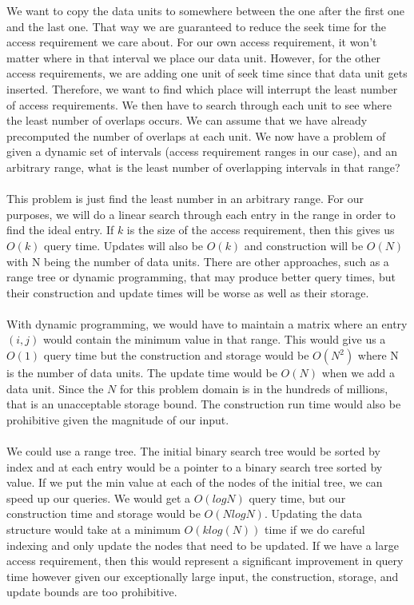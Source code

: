 \documentclass[11pt,psfig]{article}
\begin{document}
We want to copy the data units to somewhere between the one after the first one and the last one. That way we are guaranteed to reduce the seek time for the access requirement we care about. For our own access requirement, it won't matter where in that interval we place our data unit. However, for the other access requirements, we are adding one unit of seek time since that data unit gets inserted. Therefore, we want to find which place will interrupt the least number of access requirements. We then have to search through each unit to see where the least number of overlaps occurs. We can assume that we have already precomputed the number of overlaps at each unit. We now have a problem of given a dynamic set of intervals (access requirement ranges in our case), and an arbitrary range, what is the least number of overlapping intervals in that range?\\
\\
This problem is just find the least number in an arbitrary range. For our purposes, we will do a linear search through each entry in the range in order to find the ideal entry. If $k$ is the size of the access requirement, then this gives us $O(k)$ query time. Updates will also be $O(k)$ and construction will be $O(N)$ with N being the number of data units. There are other approaches, such as a range tree or dynamic programming, that may produce better query times, but their construction and update times will be worse as well as their storage. \\
\\
With dynamic programming, we would have to maintain a matrix where an entry $(i,j)$ would contain the minimum value in that range. This would give us a $O(1)$ query time but the construction and storage would be $O(N^2)$ where N is the number of data units. The update time would be $O(N)$ when we add a data unit. Since the $N$ for this problem domain is in the hundreds of millions, that is an unacceptable storage bound. The construction run time would also be prohibitive given the magnitude of our input. \\
\\
We could use a range tree. The initial binary search tree would be sorted by index and at each entry would be a pointer to a binary search tree sorted by value. If we put the min value at each of the nodes of the initial tree, we can speed up our queries. We would get a $O(log N)$ query time, but our construction time and storage would be $O(N log N)$. Updating the data structure would take at a minimum $O(k log(N))$ time if we do careful indexing and only update the nodes that need to be updated. If we have a large access requirement, then this would represent a significant improvement in query time however given our exceptionally large input, the construction, storage, and update bounds are too prohibitive.  
\end{document}

